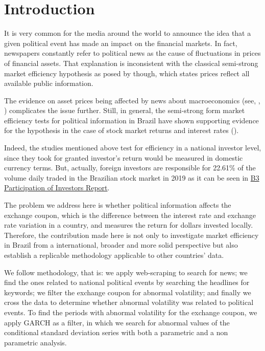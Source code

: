 \documentclass[cic,tc, english]{iiufrgs}
\begin{document}
\tableofcontents


\chapter{Introduction} \label{chapter_introduction}

    It is very common for the media around the world to announce the idea that a given political event has made an impact on the financial markets. In fact, newspapers constantly refer to political news as the cause of fluctuations in prices of financial assets. That explanation is inconsistent with the classical semi-strong market efficiency hypothesis as posed by \citet{fama1970} though, which states prices reflect all available public information.  
    
    The evidence on asset prices being affected by news about macroeconomics (see, \citet{macqueenroley1993}, \citet{caporaleetal2015}) complicates the issue further. Still, in general, the semi-strong form market efficiency tests for political information in Brazil have shown supporting evidence for the hypothesis in the case of stock market returns and interest rates (\citet{marquessantos2016}).
    
    Indeed, the studies mentioned above test for efficiency in a national investor level, since they took for granted investor's return would be measured in domestic currency terms.  But, actually, foreign investors are responsible for 22.61\% of the volume daily traded in the Brazilian stock market in 2019 as it can be seen in  \href{http://www.b3.com.br/data/files/14/B4/D5/25/4B80B61070D79EA6AC094EA8/partdir_NOVOv2.xls}{B3 Participation of Investors Report}.
    
    The problem we address here is whether political information affects the exchange coupon, which is the difference between the interest rate and exchange rate variation in a country, and measures the return for dollars invested locally. Therefore, the contribution made here is not only to investigate market efficiency in Brazil from a international, broader and more solid perspective but also establish a replicable methodology applicable to other countries' data.
    
    We follow \citet{marquessantos2016} methodology, that is: we apply web-scraping to search for news; we find the ones related to national political events by searching the headlines for keywords; we filter the exchange coupon for abnormal volatility; and finally we cross the data to determine whether abnormal volatility was related to political events. To find the periods with abnormal volatility for the exchange coupon, we apply \citet{bollerslev1986} GARCH as a filter, in which we search for abnormal values of the conditional standard deviation series with both a parametric and a non parametric analysis.
\end{document}
